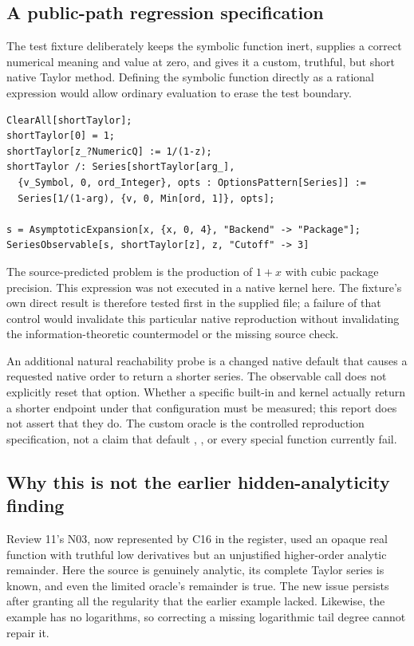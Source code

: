 \documentclass[11pt,letterpaper]{article}
\theoremstyle{definition}\newtheorem{definition}[proposition]{Definition}
\begin{document}
\subsection{A public-path regression specification}
The test fixture deliberately keeps the symbolic function inert, supplies a
correct numerical meaning and value at zero, and gives it a custom, truthful,
but short native Taylor method. Defining the symbolic function directly as a
rational expression would allow ordinary evaluation to erase the test boundary.
\begin{lstlisting}
ClearAll[shortTaylor];
shortTaylor[0] = 1;
shortTaylor[z_?NumericQ] := 1/(1-z);
shortTaylor /: Series[shortTaylor[arg_],
  {v_Symbol, 0, ord_Integer}, opts : OptionsPattern[Series]] :=
  Series[1/(1-arg), {v, 0, Min[ord, 1]}, opts];

s = AsymptoticExpansion[x, {x, 0, 4}, "Backend" -> "Package"];
SeriesObservable[s, shortTaylor[z], z, "Cutoff" -> 3]
\end{lstlisting}
The source-predicted problem is the production of $1+x$ with cubic package
precision. This expression was not executed in a native kernel here. The
fixture's own direct  result is therefore tested first in the
supplied  file; a failure of that control would invalidate this
particular native reproduction without invalidating the information-theoretic
countermodel or the missing source check.

An additional natural reachability probe is a changed native
 default that causes a requested native order to return a
shorter series. The observable call does not explicitly reset that option.
Whether a specific built-in and kernel actually return a shorter endpoint under
that configuration must be measured; this report does not assert that they do.
The custom oracle is the controlled reproduction specification, not a claim
that default , , or every special function currently fail.

\subsection{Why this is not the earlier hidden-analyticity finding}
Review 11's N03, now represented by C16 in the register, used an opaque real
function with truthful low derivatives but an unjustified higher-order analytic
remainder. Here the source is genuinely analytic, its complete Taylor series
is known, and even the limited oracle's remainder is true. The new issue
persists after granting all the regularity that the earlier example lacked.
Likewise, the example has no logarithms, so correcting a missing logarithmic
tail degree cannot repair it.\cite{review11,register}
\end{document}
